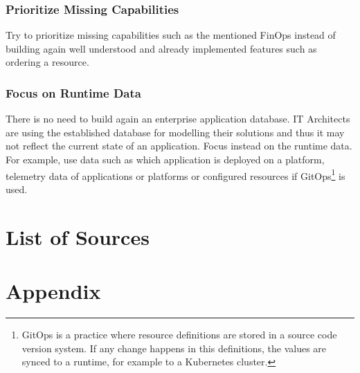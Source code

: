 \documentclass[a4paper,12pt]{article}
\begin{document}
    \subsubsection{Prioritize Missing Capabilities}
    Try to prioritize missing capabilities such as the mentioned FinOps instead of building again well understood and already
    implemented features such as ordering a resource.

    \subsubsection{Focus on Runtime Data}
    There is no need to build again an enterprise application database.
    IT Architects are using the established database for modelling their solutions and thus it may not reflect the current
    state of an application.
    Focus instead on the runtime data.
    For example, use data such as which application is deployed on a platform, telemetry data of applications or platforms or
    configured resources if GitOps\footnote{
        GitOps is a practice where resource definitions are stored in a source code version system. If any change
        happens in this definitions, the values are synced to a runtime, for example to a Kubernetes cluster.} is used.

    \pagebreak


    \section{List of Sources}
    \label{sec:bibliograhpy}
    \printbibliography[heading=none]


    \section{Appendix}
    \label{sec:appendix}
\end{document}
